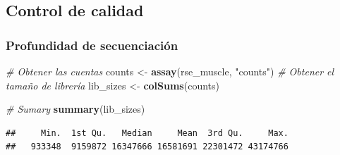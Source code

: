 \documentclass[
  spanish,
  11pt,
]{article}
\newenvironment{Shaded}{\begin{snugshade}}{\end{snugshade}}
\newcommand{\CommentTok}[1]{\textcolor[rgb]{0.56,0.35,0.01}{\textit{#1}}}
\newcommand{\FunctionTok}[1]{\textcolor[rgb]{0.13,0.29,0.53}{\textbf{#1}}}
\newcommand{\NormalTok}[1]{#1}
\newcommand{\OtherTok}[1]{\textcolor[rgb]{0.56,0.35,0.01}{#1}}
\newcommand{\StringTok}[1]{\textcolor[rgb]{0.31,0.60,0.02}{#1}}
\begin{document}
\subsection{Control de calidad}\label{control-de-calidad}

\subsubsection{Profundidad de
secuenciación}\label{profundidad-de-secuenciaciuxf3n}

\begin{Shaded}
\begin{Highlighting}[]
\CommentTok{\# Obtener las cuentas}
\NormalTok{counts }\OtherTok{\textless{}{-}} \FunctionTok{assay}\NormalTok{(rse\_muscle, }\StringTok{"counts"}\NormalTok{)}
\CommentTok{\# Obtener el tamaño de librería}
\NormalTok{lib\_sizes }\OtherTok{\textless{}{-}} \FunctionTok{colSums}\NormalTok{(counts)}

\CommentTok{\# Sumary}
\FunctionTok{summary}\NormalTok{(lib\_sizes)}
\end{Highlighting}
\end{Shaded}

\begin{verbatim}
##     Min.  1st Qu.   Median     Mean  3rd Qu.     Max. 
##   933348  9159872 16347666 16581691 22301472 43174766
\end{verbatim}
\end{document}
